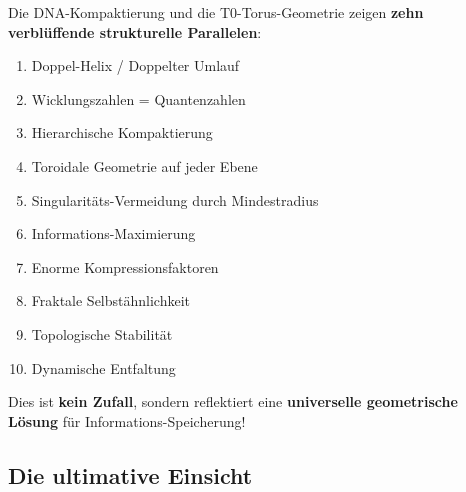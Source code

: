 	\begin{keyresult}[Hauptergebnis]
		Die DNA-Kompaktierung und die T0-Torus-Geometrie zeigen \textbf{zehn verblüffende strukturelle Parallelen}:
		
		\vspace{0.3cm}
		
		\begin{enumerate}
			\item Doppel-Helix / Doppelter Umlauf
			\item Wicklungszahlen = Quantenzahlen
			\item Hierarchische Kompaktierung
			\item Toroidale Geometrie auf jeder Ebene
			\item Singularitäts-Vermeidung durch Mindestradius
			\item Informations-Maximierung
			\item Enorme Kompressionsfaktoren
			\item Fraktale Selbstähnlichkeit
			\item Topologische Stabilität
			\item Dynamische Entfaltung
		\end{enumerate}
		
		\vspace{0.3cm}
		
		Dies ist \textbf{kein Zufall}, sondern reflektiert eine \textbf{universelle geometrische Lösung} für Informations-Speicherung!
	\end{keyresult}
	
	\subsection{Die ultimative Einsicht}
	

